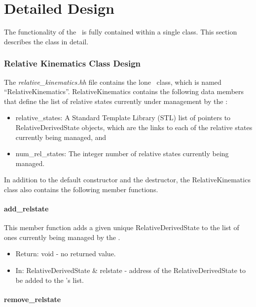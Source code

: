 \section{Detailed Design}

The functionality of the \relkinDesc\ is fully contained within a single class.
This section describes the class in detail.

\subsubsection{Relative Kinematics Class Design}

The {\em relative\_kinematics.hh} file contains the lone \relkinDesc\ class,
which is named ``RelativeKinematics''. RelativeKinematics contains the
following data members that define the list of relative states currently under
management by the \relkinDesc:

\begin{itemize}
\item{relative\_states:} A Standard Template Library (STL) list of pointers to
RelativeDerivedState objects, which are the links to each of the relative states
currently being managed, and

\item{num\_rel\_states:} The integer number of relative states currently being
managed.
\end{itemize}

In addition to the default constructor and the destructor, the
RelativeKinematics class also contains the following member functions.

\paragraph{add\_relstate}

This member function adds a given unique RelativeDerivedState to the list of
ones currently being managed by the \relkinDesc.

\begin{itemize}
\item{Return:} void - no returned value.
\item{In:} RelativeDerivedState \& relstate - address of the
RelativeDerivedState to be added to the \relkinDesc's list.
\end{itemize}

\paragraph{remove\_relstate}

